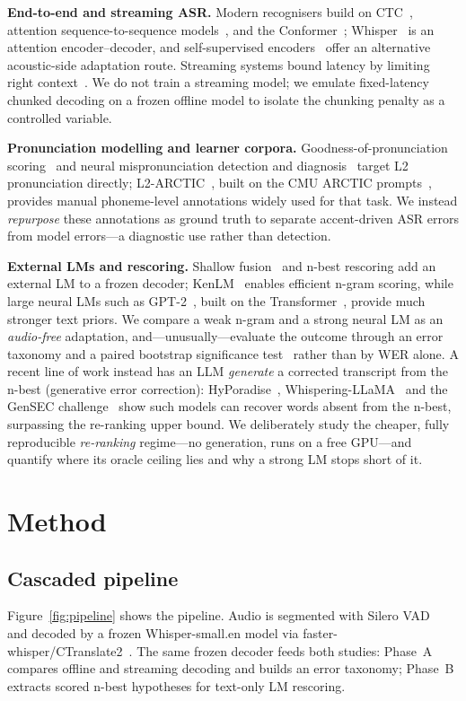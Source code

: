 \documentclass[conference]{IEEEtran}
\begin{document}
\textbf{End-to-end and streaming ASR.} Modern recognisers build on CTC~\cite{ctc}, attention sequence-to-sequence models~\cite{las}, and the Conformer~\cite{conformer}; Whisper~\cite{whisper} is an attention encoder--decoder, and self-supervised encoders~\cite{wav2vec2,hubert} offer an alternative acoustic-side adaptation route. Streaming systems bound latency by limiting right context~\cite{he2019}. We do not train a streaming model; we emulate fixed-latency chunked decoding on a frozen offline model to isolate the chunking penalty as a controlled variable.

\textbf{Pronunciation modelling and learner corpora.} Goodness-of-pronunciation scoring~\cite{wittyoung} and neural mispronunciation detection and diagnosis~\cite{mdd} target L2 pronunciation directly; L2-ARCTIC~\cite{l2arctic}, built on the CMU ARCTIC prompts~\cite{arctic}, provides manual phoneme-level annotations widely used for that task. We instead \emph{repurpose} these annotations as ground truth to separate accent-driven ASR errors from model errors---a diagnostic use rather than detection.

\textbf{External LMs and rescoring.} Shallow fusion~\cite{fusion,kannan} and n-best rescoring add an external LM to a frozen decoder; KenLM~\cite{kenlm} enables efficient n-gram scoring, while large neural LMs such as GPT-2~\cite{gpt2}, built on the Transformer~\cite{transformer}, provide much stronger text priors. We compare a weak n-gram and a strong neural LM as an \emph{audio-free} adaptation, and---unusually---evaluate the outcome through an error taxonomy and a paired bootstrap significance test~\cite{bisani,koehn} rather than by WER alone. A recent line of work instead has an LLM \emph{generate} a corrected transcript from the n-best (generative error correction): HyPoradise~\cite{hyporadise}, Whispering-LLaMA~\cite{whisperingllama} and the GenSEC challenge~\cite{gensec} show such models can recover words absent from the n-best, surpassing the re-ranking upper bound. We deliberately study the cheaper, fully reproducible \emph{re-ranking} regime---no generation, runs on a free GPU---and quantify where its oracle ceiling lies and why a strong LM stops short of it.

\section{Method}
\subsection{Cascaded pipeline}
Figure~\ref{fig:pipeline} shows the pipeline. Audio is segmented with Silero VAD~\cite{silero} and decoded by a frozen Whisper-small.en model via faster-whisper/CTranslate2~\cite{fasterwhisper}. The same frozen decoder feeds both studies: Phase~A compares offline and streaming decoding and builds an error taxonomy; Phase~B extracts scored n-best hypotheses for text-only LM rescoring.
\end{document}
